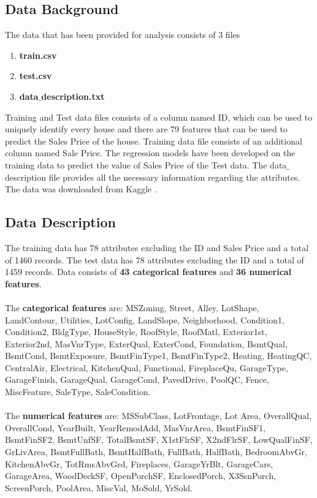 \documentclass[fleqn,10pt]{SelfArx} %
\begin{document}
\subsection{Data Background}
The data that has been provided for analysis consists of 3 files
\begin{enumerate}[noitemsep]
\item \textbf{train.csv}
\item \textbf{test.csv}
\item \textbf{data$\_$description.txt}
\end{enumerate}

Training and Test data files consists of a column named ID, which can be used to uniquely identify every house and there are 79 features that can be used to predict the Sales Price of the house. Training data file consists of an additional column named Sale Price. The regression models have been developed on the training data to predict the value of Sales Price of the Test data. The data$\_$description file provides all the necessary information regarding the attributes.
The data was downloaded from Kaggle \cite{REF:8}.


\subsection{Data Description}
The training data has 78 attributes excluding the ID and Sales Price and a total of 1460 records. The test data has 78 attributes excluding the ID and a total of 1459 records.
Data consists of \textbf{43 categorical features} and \textbf{36 numerical features}. 
\\ \\ The \textbf{categorical features} are: MSZoning, Street, Alley, LotShape, LandContour, Utilities, LotConfig, LandSlope, Neighborhood, Condition1, Condition2, BldgType, HouseStyle, RoofStyle, RoofMatl, Exterior1st, Exterior2nd, MasVnrType, ExterQual, ExterCond, Foundation, BsmtQual, BsmtCond, BsmtExposure, BsmtFinType1, BsmtFinType2, Heating, HeatingQC, CentralAir, Electrical, KitchenQual, Functional, FireplaceQu, GarageType, GarageFinish, GarageQual, GarageCond, PavedDrive, PoolQC, Fence, MiscFeature, SaleType, SaleCondition.
\\ \\The \textbf{numerical features} are: MSSubClass, LotFrontage, Lot Area, OverallQual, OverallCond, YearBuilt, YearRemodAdd, MasVnrArea, BsmtFinSF1, BsmtFinSF2, BsmtUnfSF, TotalBsmtSF, X1stFlrSF, X2ndFlrSF, LowQualFinSF, GrLivArea, BsmtFullBath, BsmtHalfBath, FullBath, HalfBath, BedroomAbvGr, KitchenAbvGr, TotRmsAbvGrd, Fireplaces, GarageYrBlt, GarageCars, GarageArea, WoodDeckSF, OpenPorchSF, EnclosedPorch, X3SsnPorch, ScreenPorch, PoolArea, MiscVal, MoSold, YrSold.
\end{document}
